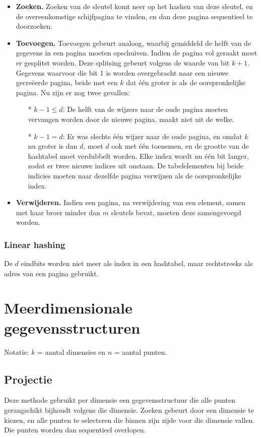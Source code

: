 \documentclass{report}
\begin{document}
\begin{itemize}
	\item \textbf{Zoeken.} Zoeken van de sleutel komt neer op het hashen van deze sleutel, en de overeenkomstige schijfpagina te vinden, en dan deze pagina sequentieel te doorzoeken. 
	\item \textbf{Toevoegen.} Toevoegen gebeurt analoog, waarbij gemiddeld de helft van de gegevens in een pagina moeten opschuiven. Indien de pagina vol geraakt moet er gesplitst worden. Deze splitsing gebeurt volgens de waarde van bit $k + 1$. Gegevens waarvoor die bit 1 is worden overgebracht naar een nieuwe gecreëerde pagina, beide met een $k$ dat één groter is als de oorspronkelijke pagina. Nu zijn er nog twee gevallen:
	\begin{itemize}
		\item[*] $k - 1 \leq d$: De helft van de wijzers naar de oude pagina moeten vervangen worden door de nieuwe pagina, maakt niet uit de welke.
		\item[*] $k - 1 = d$: Er was slechts één wijzer naar de oude pagina, en omdat $k$ nu groter is dan $d$, moet $d$ ook met één toenemen, en de grootte van de hashtabel moet verdubbelt worden. Elke index wordt nu één bit langer, zodat er twee nieuwe indices uit onstaan. De tabelelementen bij beide indicies moeten naar dezelfde pagina verwijzen als de oorspronkelijke index.
	\end{itemize}
	\item \textbf{Verwijderen.} Indien een pagina, na verwijdering van een element, samen met haar broer minder dan $m$ sleutels bevat, moeten deze samengevoegd worden.
\end{itemize}
\subsection{Linear hashing}
De $d$ eindbits worden niet meer als index in een hashtabel, maar rechtstreeks als adres van een pagina gebruikt.  


\chapter{Meerdimensionale gegevensstructuren}
Notatie: $k$ = aantal dimensies en $n$ = aantal punten.
\section{Projectie}
Deze methode gebruikt per dimensie een gegevensstructuur die alle punten gerangschikt bijhoudt volgens die dimensie. Zoeken gebeurt door een dimensie te kiezen, en alle punten te selecteren die binnen zijn zijde voor die dimensie vallen. Die punten worden dan sequentieel overlopen.
\end{document}
